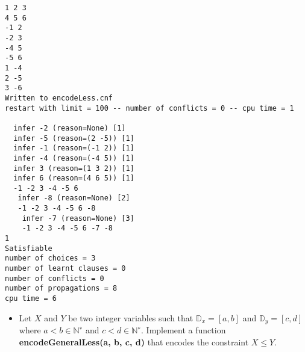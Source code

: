 \documentclass[11pt]{article}
\providecommand{\tightlist}{%
      \setlength{\itemsep}{0pt}\setlength{\parskip}{0pt}}
\begin{document}
    \begin{Verbatim}[commandchars=\\\{\}]
1 2 3 
4 5 6 
-1 2
-2 3
-4 5
-5 6
1 -4
2 -5
3 -6
Written to encodeLess.cnf
restart with limit = 100 -- number of conflicts = 0 -- cpu time = 1

  infer -2 (reason=None) [1]
  infer -5 (reason=(2 -5)) [1]
  infer -1 (reason=(-1 2)) [1]
  infer -4 (reason=(-4 5)) [1]
  infer 3 (reason=(1 3 2)) [1]
  infer 6 (reason=(4 6 5)) [1]
  -1 -2 3 -4 -5 6
   infer -8 (reason=None) [2]
   -1 -2 3 -4 -5 6 -8
    infer -7 (reason=None) [3]
    -1 -2 3 -4 -5 6 -7 -8
1
Satisfiable
number of choices = 3
number of learnt clauses = 0
number of conflicts = 0
number of propagations = 8
cpu time = 6

    \end{Verbatim}

    \begin{itemize}
\tightlist
\item
  Let \(X\) and \(Y\) be two integer variables such that
  \(\mathbb{D}_x = \left[a, b\right]\) and
  \(\mathbb{D}_y = \left[c, d\right]\) where \(a < b \in \mathbb{N}^∗\)
  and \(c < d \in \mathbb{N}^∗\). Implement a function
  \textbf{encodeGeneralLess(a, b, c, d)} that encodes the constraint
  \(X \le Y\).
\end{itemize}
\end{document}
